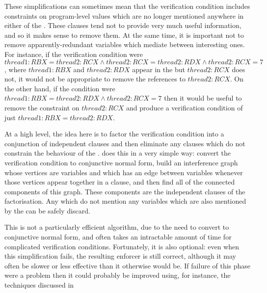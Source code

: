 These simplifications can sometimes mean that the verification
condition includes constraints on program-level values which are no
longer mentioned anywhere in either of the {\StateMachines}.  These
clauses tend not to provide very much useful information, and so it
makes sense to remove them.  At the same time, it is important not to
remove apparently-redundant variables which mediate between
interesting ones.  For instance, if the verification condition were
$thread1:RBX = thread2:RCX \wedge thread2:RCX = thread2:RDX \wedge
thread2:RCX = 7$, where $thread1:RBX$ and $thread2:RDX$ appear in the
{\StateMachines} but $thread2:RCX$ does not, it would not be
appropriate to remove the references to $thread2:RCX$.  On the other
hand, if the condition were $thread1:RBX = thread2:RDX \wedge
thread2:RCX = 7$ then it would be useful to remove the constraint on
$thread2:RCX$ and produce a verification condition of just
$thread1:RBX = thread2:RDX$.  

At a high level, the idea here is to factor the verification condition
into a conjunction of independent clauses and then eliminate any
clauses which do not constrain the behaviour of the {\StateMachines}.
{\Technique} does this in a very simple way: convert the verification
condition to conjunctive normal form, build an interference graph
whose vertices are variables and which has an edge between variables
whenever those vertices appear together in a clause, and then find all
of the connected components of this graph.  These components are the
independent clauses of the factorisation.  Any which do not mention
any variables which are also mentioned by the {\StateMachines} can be
safely discard. 

This is not a particularly efficient algorithm, due to the need to
convert to conjunctive normal form, and often takes an intractable
amount of time for complicated verification conditions.  Fortunately,
it is also optional: even when this simplification fails, the
resulting enforcer is still  correct, although it
may often be slower or less effective than it otherwise would be.  If
failure of this phase were a problem then it could probably be
improved using, for instance, the techniques discussed in 

